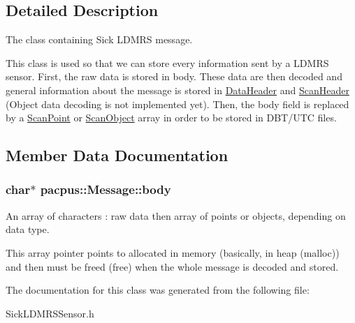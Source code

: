\subsection{Detailed Description}
The class containing Sick L\-D\-M\-R\-S message. 

This class is used so that we can store every information sent by a L\-D\-M\-R\-S sensor. First, the raw data is stored in {\ttfamily body}. These data are then decoded and general information about the message is stored in \hyperlink{structpacpus_1_1DataHeader}{Data\-Header} and \hyperlink{structpacpus_1_1ScanHeader}{Scan\-Header} (Object data decoding is not implemented yet). Then, the body field is replaced by a \hyperlink{structpacpus_1_1ScanPoint}{Scan\-Point} or \hyperlink{structpacpus_1_1ScanObject}{Scan\-Object} array in order to be stored in D\-B\-T/\-U\-T\-C files. 

\subsection{Member Data Documentation}
\hypertarget{classpacpus_1_1Message_aa6139942cf5b9fb04e9363dc3bf59bb2}{
\subsubsection[{body}]{\setlength{\rightskip}{0pt plus 5cm}char$\ast$ pacpus\-::\-Message\-::body}}\label{classpacpus_1_1Message_aa6139942cf5b9fb04e9363dc3bf59bb2}


An array of characters \-: raw data then array of points or objects, depending on data type. 

This array pointer points to allocated in memory (basically, in heap (malloc)) and then must be freed (free) when the whole message is decoded and stored. 

The documentation for this class was generated from the following file\-:\begin{DoxyCompactItemize}
\item 
Sick\-L\-D\-M\-R\-S\-Sensor.\-h\end{DoxyCompactItemize}
